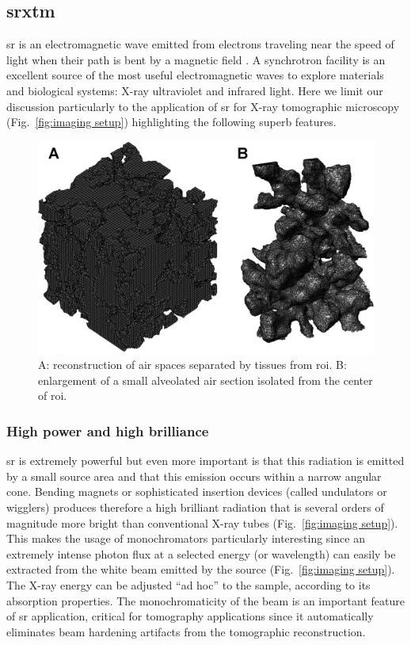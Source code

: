 \subsection{srxtm}
\ac{sr} is an electromagnetic wave emitted from electrons traveling near the speed of light when their path is bent by a magnetic field \cite{Iida2003}. A synchrotron facility is an excellent source of the most useful electromagnetic waves to explore materials and biological systems: X-ray ultraviolet and infrared light. Here we limit our discussion particularly to the application of \ac{sr} for X-ray tomographic microscopy (Fig.~\ref{fig:imaging setup}) highlighting the following superb features.

\begin{figure}[htb]
	\centering
	\includegraphics[width=\imsize]{img/Tsuda2008/Tsuda-09}
	\caption[Three-dimensional reconstruction of air spaces]{A: reconstruction of \threed air spaces separated by tissues from \ac{roi}. B: enlargement of a small alveolated air section isolated from the center of \ac{roi}.}
	\label{fig:3dalveolated}
\end{figure}

\subsubsection{High power and high brilliance}
\ac{sr} is extremely powerful but even more important is that this radiation is emitted by a small source area and that this emission occurs within a narrow angular cone. Bending magnets or sophisticated insertion devices (called undulators or wigglers) produces therefore a high brilliant radiation that is several orders of magnitude more bright than conventional X-ray tubes (Fig.~\ref{fig:imaging setup}). This makes the usage of monochromators particularly interesting since an extremely intense photon flux at a selected energy (or wavelength) can easily be extracted from the white beam emitted by the source (Fig.~\ref{fig:imaging setup}). The X-ray energy can be adjusted ``ad hoc'' to the sample, according to its absorption properties. The monochromaticity of the beam is an important feature of \ac{sr} application, critical for tomography applications since it automatically eliminates beam hardening artifacts from the tomographic reconstruction.

